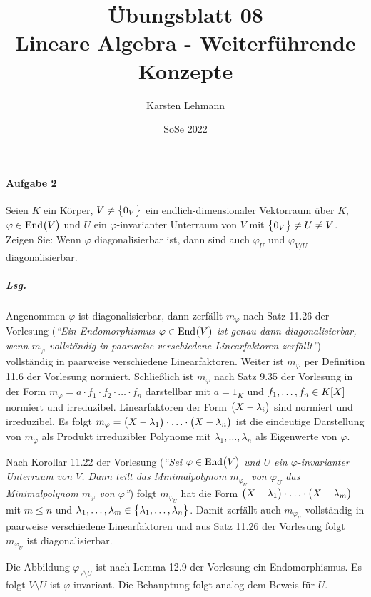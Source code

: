 \documentclass{scrreprt}
\author{Karsten Lehmann}
\date{SoSe 2022}
\title{Übungsblatt 08\\Lineare Algebra - Weiterführende Konzepte}
\newcommand\End{\text{End}}
\begin{document}
\paragraph{Aufgabe 2} Seien $K$ ein Körper, $V \ne \qty\big{0_V}$ ein
endlich-dimensionaler Vektorraum über $K$, $\varphi \in \End\qty\big(V)$
und $U$ ein $\varphi$-invarianter Unterraum von $V$ mit
$\qty\big{0_V} \ne U \ne V$.
Zeigen Sie: Wenn $\varphi$ diagonalisierbar ist, dann sind auch $\varphi_U$ und
$\varphi_{V/U}$ diagonalisierbar.

\subparagraph{Lsg.} Angenommen $\varphi$ ist diagonalisierbar, dann zerfällt
$m_{\varphi}$ nach Satz 11.26 der Vorlesung (\emph{``Ein Endomorphismus
  $\varphi \in \End\qty\big(V)$ ist genau dann diagonalisierbar, wenn
  $m_{\varphi}$ vollständig in paarweise verschiedene Linearfaktoren
  zerfällt''}) vollständig in paarweise verschiedene Linearfaktoren.
Weiter ist $m_{\varphi}$ per Definition 11.6 der Vorlesung normiert.
Schließlich ist $m_{\varphi}$ nach Satz 9.35 der Vorlesung in der Form
$m_{\varphi} = a \cdot f_1 \cdot f_2 \cdot \ldots \cdot f_n$ darstellbar mit
$a = 1_K$ und $f_1, \ldots, f_n \in K\qty[X]$ normiert und irreduzibel.
Linearfaktoren der Form $\qty\big(X - \lambda_i)$ sind normiert und irreduzibel.
Es folgt
$m_{\varphi} = \qty\big(X - \lambda_1)
\cdot \ldots \cdot \qty\big(X - \lambda_n)$
ist die eindeutige Darstellung von $m_{\varphi}$ als Produkt irreduzibler
Polynome mit $\lambda_1, \ldots, \lambda_n$ als Eigenwerte von $\varphi$.

Nach Korollar 11.22 der Vorlesung (\emph{``Sei $\varphi \in \End\qty\big(V)$ und
  $U$ ein $\varphi$-invarianter Unterraum von $V$.
  Dann teilt das Minimalpolynom $m_{\varphi_U}$ von $\varphi_U$ das
  Minimalpolynom $m_{\varphi}$ von $\varphi$''}) folgt $m_{\varphi_U}$ hat die
Form $\qty\big(X - \lambda_1) \cdot \ldots \cdot \qty\big(X - \lambda_m)$ mit
$m \leq n$ und $\lambda_1, \ldots, \lambda_m \in \qty\big{
  \lambda_1, \ldots, \lambda_n
}$.
Damit zerfällt auch $m_{\varphi_U}$ vollständig in paarweise verschiedene
Linearfaktoren und aus Satz 11.26 der Vorlesung folgt $m_{\varphi_U}$ ist
diagonalisierbar.

Die Abbildung $\varphi_{V \setminus U}$ ist nach Lemma 12.9 der Vorlesung ein
Endomorphismus.
Es folgt $V \setminus U$ ist $\varphi$-invariant.
Die Behauptung folgt analog dem Beweis für $U$.
\end{document}
